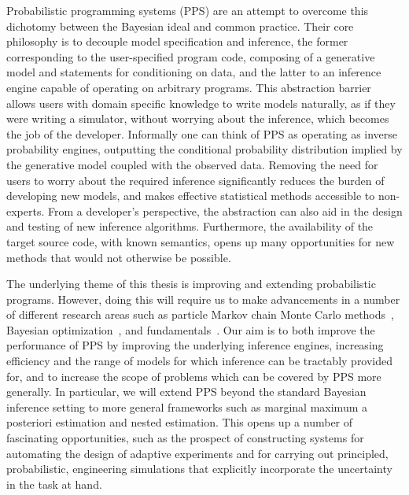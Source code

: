 Probabilistic programming systems (PPS) \citep{goodman2008church} are an attempt to
overcome this dichotomy between the Bayesian ideal and common practice.  Their core philosophy 
is to decouple model specification and inference, the former corresponding to the user-specified 
program code, composing of a generative model and statements for conditioning on data, and the 
latter to an inference engine capable of operating on arbitrary programs.  This abstraction barrier 
allows users with domain specific knowledge to write models naturally, as if they were writing a 
simulator, without worrying about the inference, which becomes the job of the developer. Informally 
one can think of PPS as operating as inverse probability engines, outputting the conditional 
probability distribution implied by the generative model coupled with the observed data.
Removing the need for users to worry about the required inference significantly reduces the 
burden of developing new models, and makes effective statistical methods accessible to 
non-experts.  From a developer's perspective, the abstraction can also aid in the design 
and testing of new inference algorithms.  Furthermore, the availability of the target source 
code, with known semantics, opens up many opportunities for new methods that would
not otherwise be possible.

The underlying theme of this thesis is improving and extending probabilistic programs.  However,
doing this will require us to make advancements in a number of different research areas such
as particle Markov chain Monte Carlo methods~\citep{andrieu2010particle,rainforth2016interacting},
Bayesian optimization~\citep{movckus1975bayesian,rainforth2016bayesian}, and \mc
fundamentals~\cite{metropolis1949monte,rainforth2016pitfalls}.  Our aim is to both improve
the performance of PPS by improving the underlying inference engines, increasing
efficiency and the range of models for which inference can be tractably provided for, and to increase
the scope of problems which can be covered by PPS more generally.  In particular, we
will extend PPS beyond the standard Bayesian inference setting to more general frameworks
such as marginal maximum a posteriori estimation and nested estimation.  This opens up a number
of fascinating opportunities, such as the prospect of constructing systems for automating the
design of adaptive experiments and for carrying out principled, probabilistic, engineering simulations
that explicitly incorporate the uncertainty in the task at hand.

